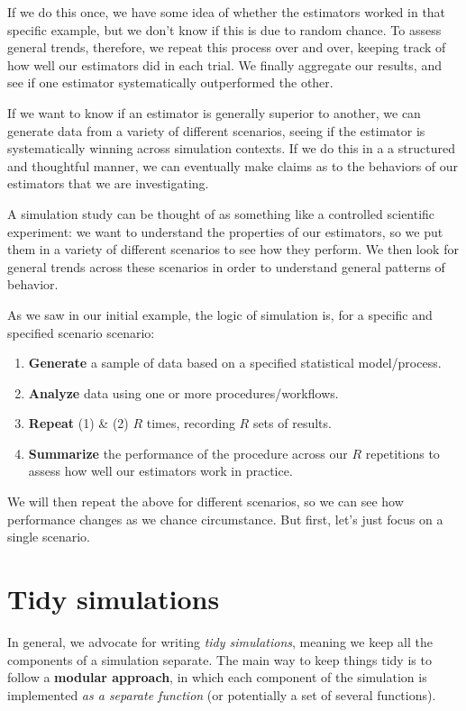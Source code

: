 \documentclass[
]{book}
\begin{document}
If we do this once, we have some idea of whether the estimators worked in that specific example, but we don't know if this is due to random chance.
To assess general trends, therefore, we repeat this process over and over, keeping track of how well our estimators did in each trial.
We finally aggregate our results, and see if one estimator systematically outperformed the other.

If we want to know if an estimator is generally superior to another, we can generate data from a variety of different scenarios, seeing if the estimator is systematically winning across simulation contexts. If we do this in a a structured and thoughtful manner, we can eventually make claims as to the behaviors of our estimators that we are investigating.

A simulation study can be thought of as something like a controlled scientific experiment: we want to understand the properties of our estimators, so we put them in a variety of different scenarios to see how they perform. We then look for general trends across these scenarios in order to understand general patterns of behavior.

As we saw in our initial example, the logic of simulation is, for a specific and specified scenario scenario:

\begin{enumerate}
\def\labelenumi{\arabic{enumi}.}
\item
  \textbf{Generate} a sample of data based on a specified statistical model/process.
\item
  \textbf{Analyze} data using one or more procedures/workflows.
\item
  \textbf{Repeat} (1) \& (2) \(R\) times, recording \(R\) sets of results.
\item
  \textbf{Summarize} the performance of the procedure across our \(R\) repetitions to assess how well our estimators work in practice.
\end{enumerate}

We will then repeat the above for different scenarios, so we can see how performance changes as we chance circumstance.
But first, let's just focus on a single scenario.

\hypertarget{tidy-simulations}{%
\section{Tidy simulations}\label{tidy-simulations}}

In general, we advocate for writing \emph{tidy simulations}, meaning we keep all the components of a simulation separate.
The main way to keep things tidy is to follow a \textbf{modular approach}, in which each component of the simulation is implemented \emph{as a separate function} (or potentially a set of several functions).
\end{document}
